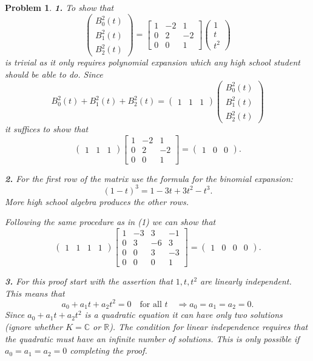 \documentclass{article}
\newcommand{\subno}[1]{\par\noindent\textbf{#1}}
\theoremstyle{pprop}
\newtheorem{problem}{Problem}[section]
\begin{document}
\begin{problem}
\subno{1.} To show that
$$
\begin{pmatrix}
B_0^2(t) \\ B_1^2(t) \\ B_2^2(t)
\end{pmatrix}=
\begin{bmatrix}
1 & -2 & 1 \\ 0 & 2 & -2 \\ 0 & 0 & 1
\end{bmatrix}
\begin{pmatrix}
1 \\ t \\ t^2
\end{pmatrix}
$$
is trivial as it only requires polynomial expansion which any high school student should be able to do.
Since
$$
B_0^2(t)+B_1^2(t)+B_2^2(t)=
\begin{pmatrix} 1 & 1 & 1 \end{pmatrix}
\begin{pmatrix}
B_0^2(t) \\ B_1^2(t) \\ B_2^2(t)
\end{pmatrix}
$$
it suffices to show that
$$
\begin{pmatrix} 1 & 1 & 1 \end{pmatrix}
\begin{bmatrix}
1 & -2 & 1 \\ 0 & 2 & -2 \\ 0 & 0 & 1
\end{bmatrix}=
\begin{pmatrix} 1 & 0 & 0 \end{pmatrix}.
$$   
\subno{2.}  For the first row of the matrix use the formula for the binomial expansion:
$$
(1-t)^3=1-3t+3t^2 -t^3.
$$
More high school algebra produces the other rows.

Following the same procedure as in (1) we can show that 
$$
\begin{pmatrix} 1 & 1 & 1 & 1 \end{pmatrix}
\begin{bmatrix}
1 & -3 & 3 & -1 \\ 0 & 3 & -6 & 3 \\ 0 & 0 & 3 & -3
\\ 0 & 0 & 0 & 1
\end{bmatrix}=
\begin{pmatrix} 1 & 0 & 0 & 0 \end{pmatrix}.
$$
\subno{3.} For this proof start with the assertion that $1,t,t^2$ are linearly independent. This means that
$$
a_0 + a_1 t + a_2 t^2=0 \quad \text{for all $t$} \quad\Rightarrow a_0=a_1=a_2=0.
$$ 
Since $a_0 + a_1 t + a_2 t^2$ is a quadratic equation it can have only two solutions (ignore whether $K=\mathbb{C}$ or $\mathbb{R}$). 
The condition for linear independence requires that the quadratic must have an infinite number of solutions. 
This is only possible if $a_0=a_1=a_2=0$ completing the proof.


\end{problem}
\end{document}
